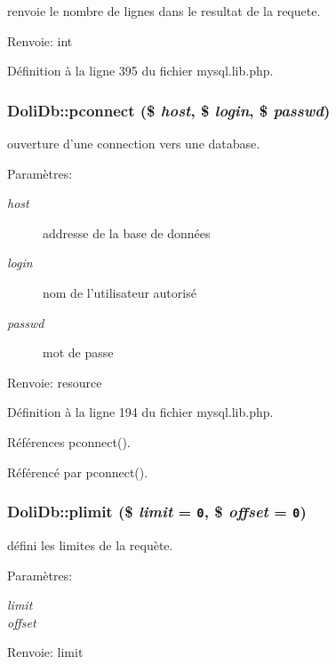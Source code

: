 renvoie le nombre de lignes dans le resultat de la requete. 

\begin{Desc}
\item[Renvoie:]int \end{Desc}


D\'{e}finition \`{a} la ligne 395 du fichier mysql.lib.php.\hypertarget{classDoliDb_a5}{
\subsubsection[pconnect]{\setlength{\rightskip}{0pt plus 5cm}Doli\-Db::pconnect (\$ {\em host}, \$ {\em login}, \$ {\em passwd})}}
\label{classDoliDb_a5}


ouverture d'une connection vers une database. 

\begin{Desc}
\item[Param\`{e}tres:]
\begin{description}
\item[{\em host}]addresse de la base de donn\'{e}es \item[{\em login}]nom de l'utilisateur autoris\'{e} \item[{\em passwd}]mot de passe \end{description}
\end{Desc}
\begin{Desc}
\item[Renvoie:]resource \end{Desc}


D\'{e}finition \`{a} la ligne 194 du fichier mysql.lib.php.

R\'{e}f\'{e}rences pconnect().

R\'{e}f\'{e}renc\'{e} par pconnect().\hypertarget{classDoliDb_a15}{
\subsubsection[plimit]{\setlength{\rightskip}{0pt plus 5cm}Doli\-Db::plimit (\$ {\em limit} = {\tt 0}, \$ {\em offset} = {\tt 0})}}
\label{classDoliDb_a15}


d\'{e}fini les limites de la requ\`{e}te. 

\begin{Desc}
\item[Param\`{e}tres:]
\begin{description}
\item[{\em limit}]\item[{\em offset}]\end{description}
\end{Desc}
\begin{Desc}
\item[Renvoie:]limit \end{Desc}


